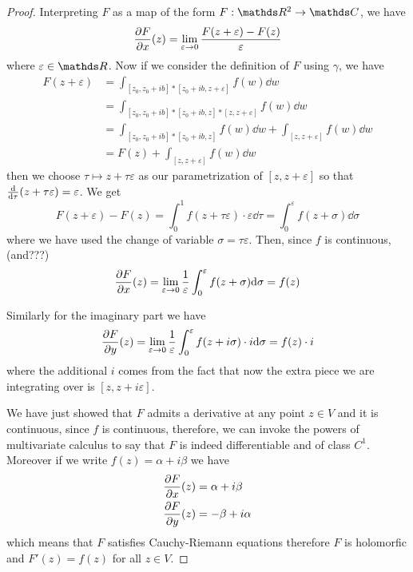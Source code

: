 \documentclass[12pt]{extarticle}
\begin{document}
\begin{proof}
	Interpreting $F$ as a map of the form $F: \R^2 \to \C$, we have
	\begin{equation}
		\pdv{F}{x}()(z) = \lim_{\varepsilon \to 0} \frac{F(z + \varepsilon) - F(z)}{\varepsilon}
	\end{equation}
	where $\varepsilon \in \R$.
	Now if we consider the definition of $F$ using $\gamma$, we have
	\begin{align}
		F(z + \varepsilon) & = \int_{[z_0, z_0 + ib] * [z_0 + ib, z + \varepsilon]} f(w) \dd w          \\
		                   & = \int_{[z_0, z_0 + ib] * [z_0 + ib, z] * [z, z + \varepsilon]} f(w) \dd w \\
		                   & = \int_{[z_0, z_0 + ib] * [z_0 + ib, z]} f(w) \dd w
		+ \int_{[z, z + \varepsilon]} f(w) \dd w                                                        \\
		                   & = F(z) + \int_{[z, z + \varepsilon]} f(w) \dd w
	\end{align}
	then we choose $\tau \mapsto z + \tau \varepsilon$ as our parametrization of $[z, z + \varepsilon]$
	so that $\dv{\tau} (z + \tau \varepsilon) = \varepsilon$.
	We get
	\begin{equation}
		F(z + \varepsilon) - F(z) = \int_0^1 f(z + \tau \varepsilon) \cdot \varepsilon \dd \tau
		= \int_0^\varepsilon f(z + \sigma) \dd{\sigma}
	\end{equation}
	where we have used the change of variable $\sigma = \tau \varepsilon$.
	Then, since $f$ is continuous, (and???)
	\begin{equation}
		\pdv{F}{x}()(z) = \lim_{\varepsilon \to 0} \frac{1}{\varepsilon}
		\int_0^\varepsilon f(z + \sigma) \dd \sigma = f(z)
	\end{equation}

	Similarly for the imaginary part we have
	\begin{equation}
		\pdv{F}{y}()(z) = \lim_{\varepsilon \to 0} \frac{1}{\varepsilon}
		\int_0^\varepsilon f(z + i \sigma) \cdot i \dd \sigma = f(z) \cdot i
	\end{equation}
	where the additional $i$ comes from the fact that now the extra piece we are integrating over is
	$[z, z + i \varepsilon]$.

	We have just showed that $F$ admits a derivative at any point $z \in V$ and it is continuous,
	since $f$ is continuous, therefore, we can invoke the powers of multivariate calculus to say that
	$F$ is indeed differentiable and of class $C^1$.
	Moreover if we write $f(z) = \alpha + i \beta$ we have
	\begin{align}
		\pdv{F}{x}()(z) & = \alpha + i \beta  \\
		\pdv{F}{y}()(z) & = - \beta + i\alpha
	\end{align}
	which means that $F$ satisfies Cauchy-Riemann equations therefore $F$ is holomorfic
	and $F'(z) = f(z)$ for all $z \in V$.
\end{proof}
\end{document}
